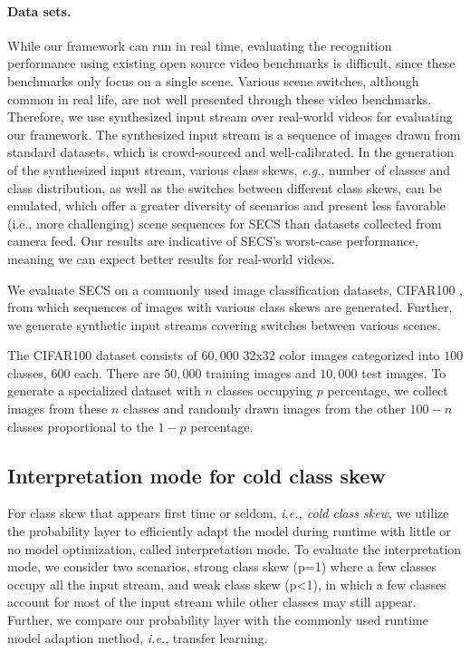 \documentclass[pageno]{jpaper}
\begin{document}
\paragraph{Data sets.} While our framework can run in real time, evaluating the recognition performance using existing open source video benchmarks \cite{lomonaco2017core50, jayaraman2016slow, ren2015faster} is difficult, since these benchmarks only focus on a single scene. Various scene switches, although common in real life, are not well presented through these video benchmarks. Therefore, we use synthesized input stream over real-world videos for evaluating our framework. The synthesized input stream is a sequence of images drawn from standard datasets, which is crowd-sourced and well-calibrated. In the generation of the synthesized input stream, various class skews, \textit{e.g.}, number of classes and class distribution, as well as the switches between different class skews, can be emulated, which offer a greater diversity of scenarios and present less favorable (i.e., more challenging) scene sequences for SECS than datasets collected from camera feed. Our results are indicative of SECS's worst-case performance, meaning we can expect better results for real-world videos.

We evaluate SECS on a commonly used image classification datasets, CIFAR100 \cite{krizhevsky2009learning}, from which sequences of images with various class skews are generated. Further, we generate synthetic input streams covering switches between various scenes. 

The CIFAR100 dataset consists of $60,000$ 32x32 color images categorized into $100$ classes, $600$ each. There are $50,000$ training images and $10,000$ test images. To generate a specialized dataset with $n$ classes occupying $p$ percentage, we collect images from these $n$ classes and randomly drawn images from the other $100-n$ classes proportional to the $1-p$ percentage.



\subsection{Interpretation mode for cold class skew}
For class skew that appears first time or seldom, \textit{i.e., cold class skew}, we utilize the probability layer to efficiently adapt the model during runtime with little or no model optimization, called interpretation mode. To evaluate the interpretation mode, we consider two scenarios, strong class skew (p=1) where a few classes occupy all the input stream, and weak class skew (p<1), in which a few classes account for most of the input stream while other classes may still appear. Further, we compare our probability layer with the commonly used runtime model adaption method, \textit{i.e.}, transfer learning.
\end{document}

